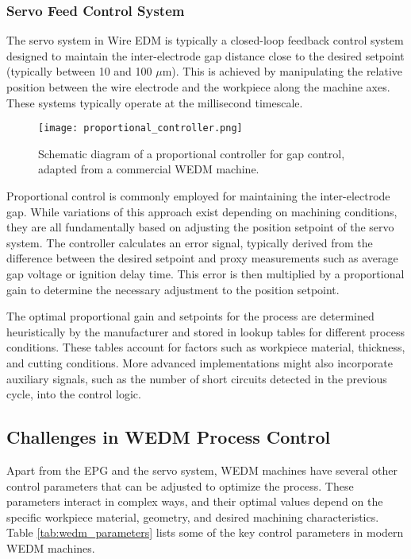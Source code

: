 \documentclass[11pt]{article}
\begin{document}
\subsubsection{Servo Feed Control System}

The servo system in Wire EDM is typically a closed-loop feedback control system designed to maintain the inter-electrode gap distance close to the desired setpoint (typically between 10 and 100 $\mu$m). This is achieved by manipulating the relative position between the wire electrode and the workpiece along the machine axes. These systems typically operate at the millisecond timescale.

\begin{figure}[H]
    \centering
    \texttt{[image: proportional\_controller.png]}
    \caption{Schematic diagram of a proportional controller for gap control, adapted from a commercial WEDM machine.}
    \label{fig:proportional_controller}
\end{figure}

Proportional control is commonly employed for maintaining the inter-electrode gap. While variations of this approach exist depending on machining conditions, they are all fundamentally based on adjusting the position setpoint of the servo system. The controller calculates an error signal, typically derived from the difference between the desired setpoint and proxy measurements such as average gap voltage or ignition delay time. This error is then multiplied by a proportional gain to determine the necessary adjustment to the position setpoint. 

The optimal proportional gain and setpoints for the process are determined heuristically by the manufacturer and stored in lookup tables for different process conditions. These tables account for factors such as workpiece material, thickness, and cutting conditions. More advanced implementations might also incorporate auxiliary signals, such as the number of short circuits detected in the previous cycle, into the control logic.

\subsection{Challenges in WEDM Process Control}

Apart from the EPG and the servo system, WEDM machines have several other control parameters that can be adjusted to optimize the process. These parameters interact in complex ways, and their optimal values depend on the specific workpiece material, geometry, and desired machining characteristics. Table \ref{tab:wedm_parameters} lists some of the key control parameters in modern WEDM machines.
\end{document}
